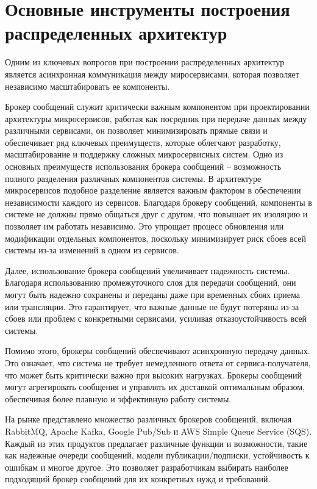 \section{Основные инструменты построения распределенных архитектур}
Одним из ключевых вопросов при построении распределенных архитектур является асинхронная коммуникация
между миросервисами, которая позволяет независимо масштабировать ее компоненты.

Брокер сообщений служит критически важным компонентом при проектировании архитектуры микросервисов, работая как посредник при передаче данных между различными сервисами, 
он позволяет минимизировать прямые связи и обеспечивает ряд ключевых преимуществ, которые облегчают разработку, масштабирование и поддержку сложных микросервисных систем.
Одно из основных преимуществ использования брокера сообщений -- возможность полного разделения различных компонентов системы. 
В архитектуре микросервисов подобное разделение является важным фактором в обеспечении независимости каждого из сервисов. 
Благодаря брокеру сообщений, компоненты в системе не должны прямо общаться друг с другом, что повышает их изоляцию и позволяет им работать независимо. 
Это упрощает процесс обновления или модификации отдельных компонентов, поскольку минимизирует риск сбоев всей системы из-за изменений в одном из сервисов.

Далее, использование брокера сообщений увеличивает надежность системы. Благодаря использованию промежуточного слоя для передачи сообщений, они могут быть надежно сохранены и переданы даже при временных сбоях приема или трансляции. 
Это гарантирует, что важные данные не будут потеряны из-за сбоев или проблем с конкретными сервисами, усиливая отказоустойчивость всей системы.

Помимо этого, брокеры сообщений обеспечивают асинхронную передачу данных. 
Это означает, что система не требует немедленного ответа от сервиса-получателя, что может быть критически важно при высоких нагрузках. 
Брокеры сообщений могут агрегировать сообщения и управлять их доставкой оптимальным образом, обеспечивая более плавную и эффективную работу системы.

На рынке представлено множество различных брокеров сообщений, включая RabbitMQ, Apache Kafka, Google Pub/Sub и AWS Simple Queue Service (SQS). 
Каждый из этих продуктов предлагает различные функции и возможности, такие как надежные очереди сообщений, модели публикации/подписки, устойчивость к ошибкам и многое другое. 
Это позволяет разработчикам выбирать наиболее подходящий брокер сообщений для их конкретных нужд и требований.

